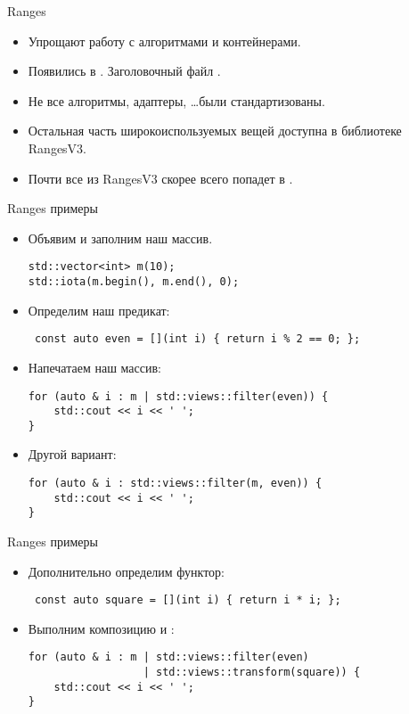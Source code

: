 \documentclass{beamer}
\begin{document}
\begin{frame}[fragile]{Ranges}
    \begin{itemize}
        \item Упрощают работу с алгоритмами и контейнерами.
        \item Появились в \langcpp[20]. Заголовочный файл .
        \item Не все алгоритмы, адаптеры, \dots были стандартизованы.
        \item Остальная часть широкоиспользуемых вещей доступна в библиотеке RangesV3.
        \item Почти все из RangesV3 скорее всего попадет в \langcpp[23].
    \end{itemize}
\end{frame}

\begin{frame}[fragile]{Ranges примеры}
    \begin{itemize}
        \item Объявим и заполним наш массив.
        \begin{lstlisting}
std::vector<int> m(10);
std::iota(m.begin(), m.end(), 0);
            \end{lstlisting}
        \item Определим наш предикат:
            \begin{lstlisting}
 const auto even = [](int i) { return i % 2 == 0; };
            \end{lstlisting}
        \item Напечатаем наш массив:
            \begin{lstlisting}
for (auto & i : m | std::views::filter(even)) {
    std::cout << i << ' ';
}
            \end{lstlisting}
        \item Другой вариант:
            \begin{lstlisting}
for (auto & i : std::views::filter(m, even)) {
    std::cout << i << ' ';
}
            \end{lstlisting}
    \end{itemize}
\end{frame}

\begin{frame}[fragile]{Ranges примеры}
    \begin{itemize}
        \item Дополнительно определим функтор:
            \begin{lstlisting}
 const auto square = [](int i) { return i * i; };
            \end{lstlisting}
        \item Выполним композицию  и :
            \begin{lstlisting}
for (auto & i : m | std::views::filter(even)
                  | std::views::transform(square)) {
    std::cout << i << ' ';
}
            \end{lstlisting}
    \end{itemize}
\end{frame}
\end{document}
